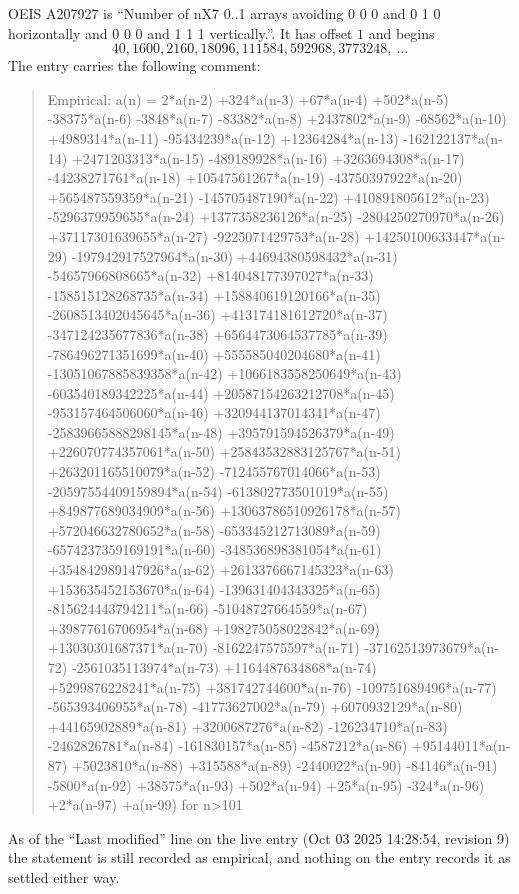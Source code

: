 \documentclass[11pt,a4paper]{article}
\theoremstyle{plain}
\theoremstyle{definition}
\begin{document}
OEIS A207927 is ``Number of nX7 0..1 arrays avoiding 0 0 0 and 0 1 0 horizontally and 0 0 0 and 1 1 1 vertically.''. It has offset
$1$ and begins
\[
40, 1600, 2160, 18096, 111584, 592968, 3773248,\ \dots
\]
The entry carries the following comment:
\begin{quote}\small
Empirical: a(n) = 2*a(n-2) +324*a(n-3) +67*a(n-4) +502*a(n-5) -38375*a(n-6) -3848*a(n-7) -83382*a(n-8) +2437802*a(n-9) -68562*a(n-10) +4989314*a(n-11) -95434239*a(n-12) +12364284*a(n-13) -162122137*a(n-14) +2471203313*a(n-15) -489189928*a(n-16) +3263694308*a(n-17) -44238271761*a(n-18) +10547561267*a(n-19) -43750397922*a(n-20) +565487559359*a(n-21) -145705487190*a(n-22) +410891805612*a(n-23) -5296379959655*a(n-24) +1377358236126*a(n-25) -2804250270970*a(n-26) +37117301639655*a(n-27) -9225071429753*a(n-28) +14250100633447*a(n-29) -197942917527964*a(n-30) +44694380598432*a(n-31) -54657966808665*a(n-32) +814048177397027*a(n-33) -158515128268735*a(n-34) +158840619120166*a(n-35) -2608513402045645*a(n-36) +413174181612720*a(n-37) -347124235677836*a(n-38) +6564473064537785*a(n-39) -786496271351699*a(n-40) +555585040204680*a(n-41) -13051067885839358*a(n-42) +1066183558250649*a(n-43) -603540189342225*a(n-44) +20587154263212708*a(n-45) -953157464506060*a(n-46) +320944137014341*a(n-47) -25839665888298145*a(n-48) +395791594526379*a(n-49) +226070774357061*a(n-50) +25843532883125767*a(n-51) +263201165510079*a(n-52) -712455767014066*a(n-53) -20597554409159894*a(n-54) -613802773501019*a(n-55) +849877689034909*a(n-56) +13063786510926178*a(n-57) +572046632780652*a(n-58) -653345212713089*a(n-59) -6574237359169191*a(n-60) -348536898381054*a(n-61) +354842989147926*a(n-62) +2613376667145323*a(n-63) +153635452153670*a(n-64) -139631404343325*a(n-65) -815624443794211*a(n-66) -51048727664559*a(n-67) +39877616706954*a(n-68) +198275058022842*a(n-69) +13030301687371*a(n-70) -8162247575597*a(n-71) -37162513973679*a(n-72) -2561035113974*a(n-73) +1164487634868*a(n-74) +5299876228241*a(n-75) +381742744600*a(n-76) -109751689496*a(n-77) -565393406955*a(n-78) -41773627002*a(n-79) +6070932129*a(n-80) +44165902889*a(n-81) +3200687276*a(n-82) -126234710*a(n-83) -2462826781*a(n-84) -161830157*a(n-85) -4587212*a(n-86) +95144011*a(n-87) +5023810*a(n-88) +315588*a(n-89) -2440022*a(n-90) -84146*a(n-91) -5800*a(n-92) +38575*a(n-93) +502*a(n-94) +25*a(n-95) -324*a(n-96) +2*a(n-97) +a(n-99) for n>101
\end{quote}
As of the ``Last modified'' line on the live entry (Oct 03 2025 14:28:54, revision
9) the statement is still recorded as empirical, and nothing on the entry
records it as settled either way.
\end{document}
